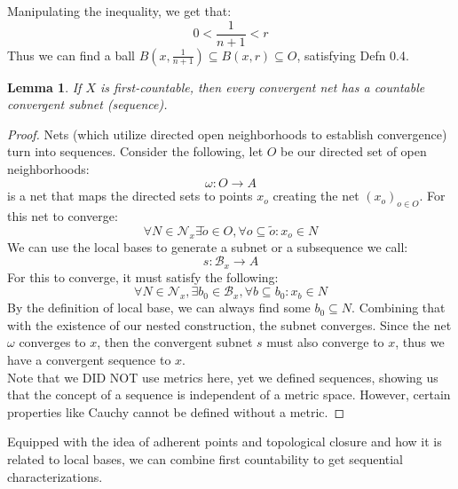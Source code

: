 \documentclass{exam}
\newtheorem{lem}{Lemma}[section]
\begin{document}
Manipulating the inequality, we get that:
\begin{equation*}
  0 < \frac{1}{n+1} < r
\end{equation*}
Thus we can find a ball $B\left(x, \frac{1}{n+1}\right) \subseteq B(x, r) \subseteq O$, satisfying Defn 0.4.\\

\begin{lem}
If $X$ is first-countable, then every convergent net has a countable convergent subnet (sequence).
\end{lem}
\begin{proof}
Nets (which utilize directed open neighborhoods to establish convergence) turn into sequences. Consider the following, let $O$ be our directed set of open neighborhoods:
\begin{equation*}
  \omega: O \xrightarrow{} A
\end{equation*}
is a net that maps the directed sets to points $x_o$ creating the net $(x_o)_{o \in O}$. For this net to converge:
\begin{equation*}
  \forall N \in \mathcal{N}_x \exists \tilde{o} \in O, \forall o \subseteq \tilde{o}: x_o \in N
\end{equation*}
We can use the local bases to generate a subnet or a subsequence we call:
\begin{equation*}
  s: \mathcal{B}_x \xrightarrow{} A
\end{equation*}
For this to converge, it must satisfy the following:
\begin{equation*}
  \forall N \in \mathcal{N}_x, \exists b_0 \in \mathcal{B}_x, \forall b \subseteq b_0: x_b \in N
\end{equation*}
By the definition of local base, we can always find some $b_0 \subseteq N$. Combining that with the existence of our nested construction, the subnet converges. Since the net $\omega$ converges to $x$, then the convergent subnet $s$ must also converge to $x$, thus we have a convergent sequence to $x$.\\

Note that we DID NOT use metrics here, yet we defined sequences, showing us that the concept of a sequence is independent of a metric space. However, certain properties like Cauchy cannot be defined without a metric.
\end{proof}

Equipped with the idea of adherent points and topological closure and how it is related to local bases, we can combine first countability to get sequential characterizations.
\end{document}
